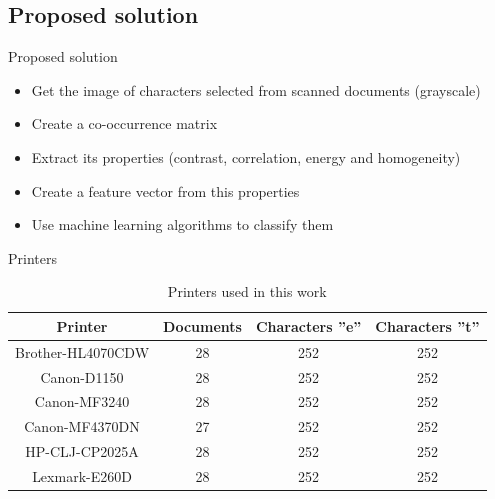 \documentclass[notes]{beamer}
\begin{document}
\begin{frame}
\section{Proposed solution}
\begin{block}{Proposed solution}

\begin{itemize}

\item Get the image of characters selected from scanned documents (grayscale)

\item Create a co-occurrence matrix

\item Extract its properties (contrast, correlation, energy and homogeneity)

\item Create a feature vector from this properties

\item Use machine learning algorithms to classify them

\end{itemize}

\end{block}

\end{frame}

\begin{frame}

\begin{block}{Printers}

\begin{table}
\caption{Printers used in this work}
\label{tab:printers}
\begin{small}
\begin{center}
\begin{tabular}{ | c | c | c | c |}
\hline
Printer & Documents & Characters ''e'' & Characters ''t'' \\ \hline
Brother-HL4070CDW & 28 & 252 & 252\\
Canon-D1150 & 28 & 252 & 252\\
Canon-MF3240 & 28 & 252 & 252\\
Canon-MF4370DN & 27 & 252 & 252 \\
HP-CLJ-CP2025A & 28 & 252 & 252\\
Lexmark-E260D & 28 & 252 & 252\\
\hline
\end{tabular}
\end{center}   
\end{small} 
\end{table}

\end{block}

\end{frame}
\end{document}
